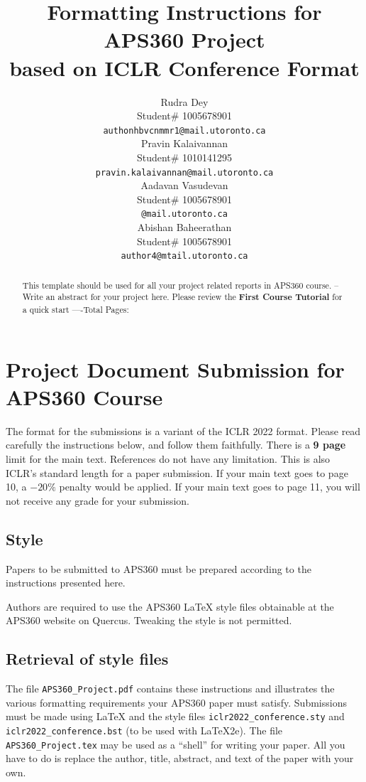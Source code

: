 \documentclass{article} %
\title{Formatting Instructions for APS360 Project  \\ 
based on ICLR Conference Format}
\author{Rudra Dey  \\
Student\# 1005678901\\
\texttt{authonhbvcnmmr1@mail.utoronto.ca} \\
\And
Pravin Kalaivannan  \\
Student\# 1010141295 \\
\texttt{pravin.kalaivannan@mail.utoronto.ca} \\
\AND
Aadavan Vasudevan  \\
Student\# 1005678901 \\
\texttt{@mail.utoronto.ca} \\
\And
Abishan Baheerathan \\
Student\# 1005678901 \\
\texttt{author4@mtail.utoronto.ca} \\
\AND
}
\begin{document}
\maketitle

\begin{abstract}
This template should be used for all your project related reports in APS360 course. -- Write an abstract for your project here. Please review the \textbf{ First Course Tutorial} for a quick start
----Total Pages: \pageref{last_page}
\end{abstract}



\section{Project Document Submission for APS360 Course}


The format for the submissions is a variant of the ICLR 2022 format.
Please read carefully the instructions below, and follow them
faithfully. There is a \textbf{9 page} limit for the main text. References do not have any limitation. This is also ICLR's standard length for a paper submission. 
If your main text goes to page 10, a $-20\%$ penalty would be applied. If your main text goes to page 11, you will not receive any grade for your submission. 

\subsection{Style}

Papers to be submitted to APS360 must be prepared according to the
instructions presented here.

Authors are required to use the APS360 \LaTeX{} style files obtainable at the
APS360 website on Quercus. Tweaking the style is not permitted.

\subsection{Retrieval of style files}

The file \verb+APS360_Project.pdf+ contains these
instructions and illustrates the various formatting requirements your APS360 paper must satisfy.
Submissions must be made using \LaTeX{} and the style files
\verb+iclr2022_conference.sty+ and \verb+iclr2022_conference.bst+ (to be used with \LaTeX{}2e). The file
\verb+APS360_Project.tex+ may be used as a ``shell'' for writing your paper. All you have to do is replace the author, title, abstract, and text of the paper with
your own.
\end{document}
